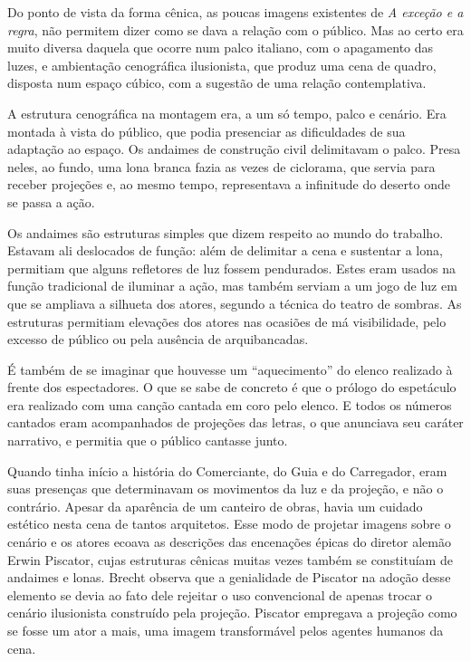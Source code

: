 Do ponto de vista da forma cênica, as poucas imagens existentes de
{\it A exceção e a regra}, não permitem dizer como se dava a relação com
o público. Mas ao certo era muito diversa daquela que ocorre num palco
italiano, com o apagamento das luzes, e ambientação cenográfica
ilusionista, que produz uma cena de quadro, disposta num espaço cúbico,
com a sugestão de uma relação contemplativa.


A estrutura cenográfica na montagem era, a um só tempo, palco e cenário.
Era montada à vista do público, que podia presenciar as dificuldades de
sua adaptação ao espaço. Os andaimes de construção civil delimitavam o
palco. Presa neles, ao fundo, uma lona branca fazia as vezes de
ciclorama, que servia para receber projeções e, ao mesmo tempo,
representava a infinitude do deserto onde se passa a ação.

Os andaimes são estruturas simples que dizem respeito ao mundo do
trabalho. Estavam ali deslocados de função: além de delimitar a cena e
sustentar a lona, permitiam que alguns refletores de luz fossem
pendurados. Estes eram usados na função tradicional de iluminar a ação,
mas também serviam a um jogo de luz em que se ampliava a silhueta dos
atores, segundo a técnica do teatro de sombras. As estruturas permitiam
elevações dos atores nas ocasiões de má visibilidade, pelo excesso de
público ou pela ausência de arquibancadas.

É também de se imaginar que houvesse um “aquecimento” do elenco
realizado à frente dos espectadores. O que se sabe de concreto é que o
prólogo do espetáculo era realizado com uma canção cantada em coro pelo
elenco. E todos os números cantados eram acompanhados de projeções das
letras, o que anunciava seu caráter narrativo, e permitia que o público
cantasse junto.

Quando tinha início a história do Comerciante, do Guia e do Carregador,
eram suas presenças que determinavam os movimentos da luz e da projeção,
e não o contrário. Apesar da aparência de um canteiro de obras, havia um
cuidado estético nesta cena de tantos arquitetos. Esse modo de projetar
imagens sobre o cenário e os atores ecoava as descrições das encenações
épicas do diretor alemão Erwin Piscator, cujas estruturas cênicas muitas
vezes também se constituíam de andaimes e lonas. Brecht observa que a
genialidade de Piscator na adoção desse elemento se devia ao fato dele
rejeitar o uso convencional de apenas trocar o cenário ilusionista
construído pela projeção. Piscator empregava a projeção como se fosse um
ator a mais, uma imagem transformável pelos agentes humanos da cena.

